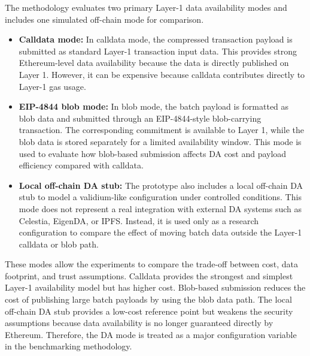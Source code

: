 The methodology evaluates two primary Layer-1 data availability modes and includes one simulated off-chain mode for comparison.

\begin{itemize}
    \item \textbf{Calldata mode:} 
    In calldata mode, the compressed transaction payload is submitted as standard Layer-1 transaction input data. This provides strong Ethereum-level data availability because the data is directly published on Layer 1. However, it can be expensive because calldata contributes directly to Layer-1 gas usage.

    \item \textbf{EIP-4844 blob mode:} 
    In blob mode, the batch payload is formatted as blob data and submitted through an EIP-4844-style blob-carrying transaction. The corresponding commitment is available to Layer 1, while the blob data is stored separately for a limited availability window. This mode is used to evaluate how blob-based submission affects DA cost and payload efficiency compared with calldata.

    \item \textbf{Local off-chain DA stub:} 
    The prototype also includes a local off-chain DA stub to model a validium-like configuration under controlled conditions. This mode does not represent a real integration with external DA systems such as Celestia, EigenDA, or IPFS. Instead, it is used only as a research configuration to compare the effect of moving batch data outside the Layer-1 calldata or blob path.
\end{itemize}

These modes allow the experiments to compare the trade-off between cost, data footprint, and trust assumptions. Calldata provides the strongest and simplest Layer-1 availability model but has higher cost. Blob-based submission reduces the cost of publishing large batch payloads by using the blob data path. The local off-chain DA stub provides a low-cost reference point but weakens the security assumptions because data availability is no longer guaranteed directly by Ethereum. Therefore, the DA mode is treated as a major configuration variable in the benchmarking methodology.

